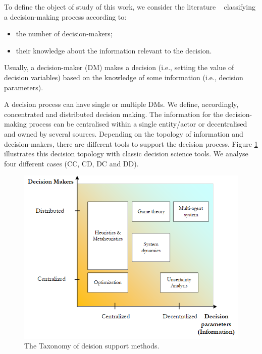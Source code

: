 To define the object of study of this work, we consider the literature ~\cite{Stecca2019} classifying a decision-making process according to:

\begin{itemize}
    \item the number of decision-makers;
    \item their knowledge about the information relevant to the decision. 
\end{itemize}

Usually, a decision-maker (DM) makes a decision (i.e., setting the value of decision variables) based on the knowledge of some information (i.e., decision parameters).\par

A decision process can have single or multiple DMs. We define, accordingly, concentrated and distributed decision making. The information for the decision-making process can be centralised within a single entity/actor or decentralised and owned by several sources. Depending on the topology of information and decision-makers, there are different tools to support the decision process. Figure \ref{fig_decisionsParMak} illustrates this decision topology with classic decision science tools. We analyse four different cases (CC, CD, DC and DD).

\begin{figure}[hbt!]
\centering
\includegraphics[width=1\textwidth]{SectionIntroduction/introduction_figures/fig_decisionsParMak.png}
\captionsetup{type=figure}
\caption{The Taxonomy of deision support methods.}
\label{fig_decisionsParMak}
\end{figure}

